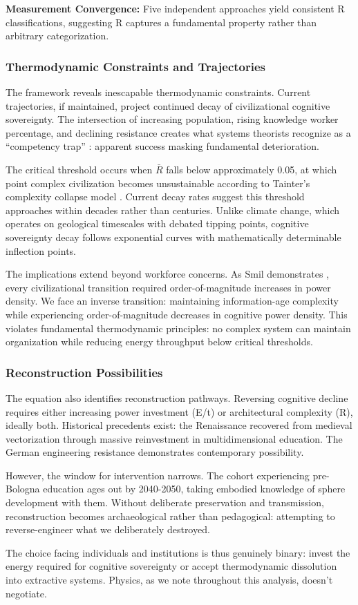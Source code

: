 \textbf{Measurement Convergence:} Five independent approaches yield consistent R classifications, suggesting R captures a fundamental property rather than arbitrary categorization.

\subsubsection{Thermodynamic Constraints and Trajectories}

The framework reveals inescapable thermodynamic constraints. Current trajectories, if maintained, project continued decay of civilizational cognitive sovereignty. The intersection of increasing population, rising knowledge worker percentage, and declining resistance creates what systems theorists recognize as a ``competency trap'' \citep{levitt1988}: apparent success masking fundamental deterioration.

The critical threshold occurs when $\bar{R}$ falls below approximately 0.05, at which point complex civilization becomes unsustainable according to Tainter's complexity collapse model \citep{tainter1988}. Current decay rates suggest this threshold approaches within decades rather than centuries. Unlike climate change, which operates on geological timescales with debated tipping points, cognitive sovereignty decay follows exponential curves with mathematically determinable inflection points.

The implications extend beyond workforce concerns. As Smil demonstrates \citep{smil2017}, every civilizational transition required order-of-magnitude increases in power density. We face an inverse transition: maintaining information-age complexity while experiencing order-of-magnitude decreases in cognitive power density. This violates fundamental thermodynamic principles: no complex system can maintain organization while reducing energy throughput below critical thresholds.

\subsubsection{Reconstruction Possibilities}

The equation also identifies reconstruction pathways. Reversing cognitive decline requires either increasing power investment (E/t) or architectural complexity (R), ideally both. Historical precedents exist: the Renaissance recovered from medieval vectorization through massive reinvestment in multidimensional education. The German engineering resistance demonstrates contemporary possibility.

However, the window for intervention narrows. The cohort experiencing pre-Bologna education ages out by 2040-2050, taking embodied knowledge of sphere development with them. Without deliberate preservation and transmission, reconstruction becomes archaeological rather than pedagogical: attempting to reverse-engineer what we deliberately destroyed.

The choice facing individuals and institutions is thus genuinely binary: invest the energy required for cognitive sovereignty or accept thermodynamic dissolution into extractive systems. Physics, as we note throughout this analysis, doesn't negotiate.